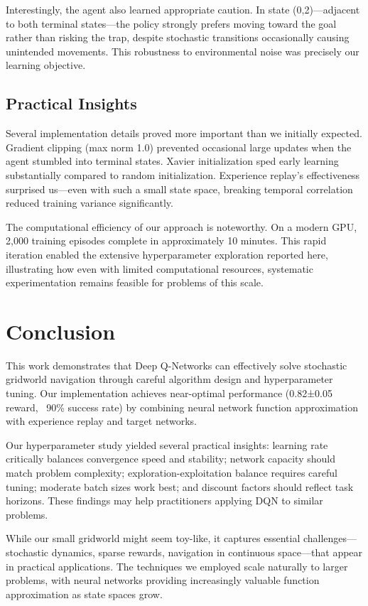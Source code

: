 \documentclass[conference]{IEEEtran}
\begin{document}
Interestingly, the agent also learned appropriate caution. In state (0,2)—adjacent to both terminal states—the policy strongly prefers moving toward the goal rather than risking the trap, despite stochastic transitions occasionally causing unintended movements. This robustness to environmental noise was precisely our learning objective.

\subsection{Practical Insights}

Several implementation details proved more important than we initially expected. Gradient clipping (max norm 1.0) prevented occasional large updates when the agent stumbled into terminal states. Xavier initialization sped early learning substantially compared to random initialization. Experience replay's effectiveness surprised us—even with such a small state space, breaking temporal correlation reduced training variance significantly.

The computational efficiency of our approach is noteworthy. On a modern GPU, 2,000 training episodes complete in approximately 10 minutes. This rapid iteration enabled the extensive hyperparameter exploration reported here, illustrating how even with limited computational resources, systematic experimentation remains feasible for problems of this scale.

\section{Conclusion}

This work demonstrates that Deep Q-Networks can effectively solve stochastic gridworld navigation through careful algorithm design and hyperparameter tuning. Our implementation achieves near-optimal performance (0.82±0.05 reward, ~90\% success rate) by combining neural network function approximation with experience replay and target networks.

Our hyperparameter study yielded several practical insights: learning rate critically balances convergence speed and stability; network capacity should match problem complexity; exploration-exploitation balance requires careful tuning; moderate batch sizes work best; and discount factors should reflect task horizons. These findings may help practitioners applying DQN to similar problems.

While our small gridworld might seem toy-like, it captures essential challenges—stochastic dynamics, sparse rewards, navigation in continuous space—that appear in practical applications. The techniques we employed scale naturally to larger problems, with neural networks providing increasingly valuable function approximation as state spaces grow.
\end{document}
